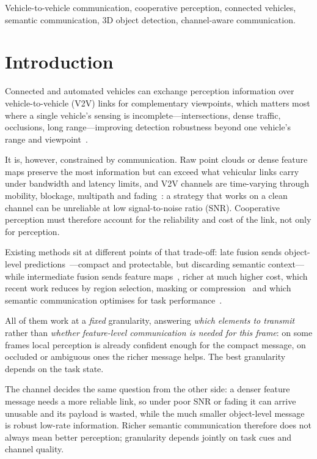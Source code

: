 \documentclass[journal]{IEEEtran}
\begin{document}
\begin{IEEEkeywords}
Vehicle-to-vehicle communication, cooperative perception, connected vehicles, semantic communication, 3D object detection, channel-aware communication.
\end{IEEEkeywords}

\section{Introduction}

Connected and automated vehicles can exchange perception information over vehicle-to-vehicle (V2V) links for complementary viewpoints, which matters most where a single vehicle's sensing is incomplete---intersections, dense traffic, occlusions, long range---improving detection robustness beyond one vehicle's range and viewpoint~\cite{xu2022opv2v,xu2022v2xvit}.

It is, however, constrained by communication. Raw point clouds or dense feature maps preserve the most information but can exceed what vehicular links carry under bandwidth and latency limits, and V2V channels are time-varying through mobility, blockage, multipath and fading~\cite{ieee80211bd,3gpp37885}: a strategy that works on a clean channel can be unreliable at low signal-to-noise ratio (SNR). Cooperative perception must therefore account for the reliability and cost of the link, not only for perception.

Existing methods sit at different points of that trade-off: late fusion sends object-level predictions~\cite{xu2022opv2v}---compact and protectable, but discarding semantic context---while intermediate fusion sends feature maps~\cite{xu2022v2xvit,hu2022where2comm}, richer at much higher cost, which recent work reduces by region selection, masking or compression~\cite{hu2022where2comm} and which semantic communication optimises for task performance~\cite{sheng2024importance,gan2026scomcp}.

All of them work at a \emph{fixed} granularity, answering \emph{which elements to transmit} rather than \emph{whether feature-level communication is needed for this frame}: on some frames local perception is already confident enough for the compact message, on occluded or ambiguous ones the richer message helps. The best granularity depends on the task state.

The channel decides the same question from the other side: a denser feature message needs a more reliable link, so under poor SNR or fading it can arrive unusable and its payload is wasted, while the much smaller object-level message is robust low-rate information. Richer semantic communication therefore does not always mean better perception; granularity depends jointly on task cues and channel quality.
\end{document}
